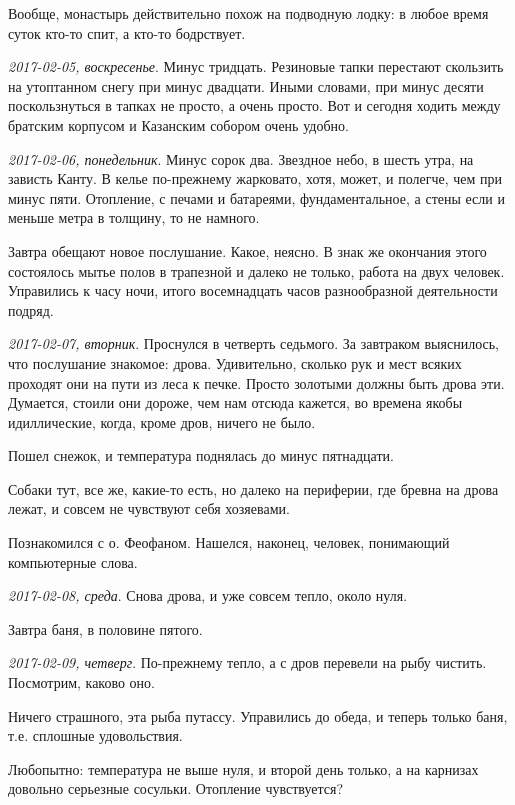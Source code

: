 \documentclass[
    12pt
    ,a4paper
    ,oneside
    ,russian
]{memoir}
\newcommand{\mydatestamp}{
    \bigskip   %
    \emph
}
\newcommand{\mds}{\mydatestamp}
\begin{document}
    Вообще, монастырь действительно похож на подводную лодку: в любое время суток кто-то спит, а кто-то бодрствует.
    
    \mds{2017-02-05, воскресенье}. Минус тридцать. Резиновые тапки перестают скользить на утоптанном снегу при минус двадцати. Иными словами, при минус десяти поскользнуться в тапках не просто, а очень просто. Вот и сегодня ходить между братским корпусом и Казанским собором очень удобно.
    
    \mds{2017-02-06, понедельник}. Минус сорок два. Звездное небо, в шесть утра, на зависть Канту. В келье по-прежнему жарковато, хотя, может, и полегче, чем при минус пяти. Отопление, с печами и батареями, фундаментальное, а стены если и меньше метра в толщину, то не намного.
    
    Завтра обещают новое послушание. Какое, неясно. В знак же окончания этого состоялось мытье полов в трапезной и далеко не только, работа на двух человек. Управились к часу ночи, итого восемнадцать часов разнообразной деятельности подряд.
    
    \mds{2017-02-07, вторник}. Проснулся в четверть седьмого. За завтраком выяснилось, что послушание знакомое: дрова. Удивительно, сколько рук и мест всяких проходят они на пути из леса к печке. Просто золотыми должны быть дрова эти. Думается, стоили они дороже, чем нам отсюда кажется, во времена якобы идиллические, когда, кроме дров, ничего не было.
    
    Пошел снежок, и температура поднялась до минус пятнадцати.
    
    Собаки тут, все же, какие-то есть, но далеко на периферии, где бревна на дрова лежат, и совсем не чувствуют себя хозяевами.
    
    Познакомился с о. Феофаном. Нашелся, наконец, человек, понимающий компьютерные слова.
    
    \mds{2017-02-08, среда}. Снова дрова, и уже совсем тепло, около нуля.
    
    Завтра баня, в половине пятого.
    
    \mds{2017-02-09, четверг}. По-прежнему тепло, а с дров перевели на рыбу чистить. Посмотрим, каково оно.
    
    Ничего страшного, эта рыба путассу. Управились до обеда, и теперь только баня, т.е. сплошные удовольствия.
    
    Любопытно: температура не выше нуля, и второй день только, а на карнизах довольно серьезные сосульки. Отопление чувствуется?
    
\end{document}
